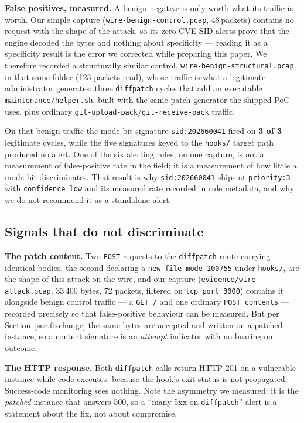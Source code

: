 \textbf{False positives, measured.} A benign negative is only worth what its
traffic is worth. Our simple capture (\texttt{wire-benign-control.pcap},
48\,packets) contains no request with the shape of the attack, so its zero
CVE-SID alerts prove that the engine decoded the bytes and nothing about
specificity --- reading it as a specificity result is the error we corrected
while preparing this paper. We therefore recorded a structurally similar control,
\texttt{wire-benign-structural.pcap} in that same folder (123 packets read),
whose traffic is what a legitimate administrator generates: three
\texttt{diffpatch} cycles that add an executable \texttt{maintenance/helper.sh},
built with the same patch generator the shipped PoC uses, plus ordinary
\texttt{git-upload-pack}\allowbreak/\allowbreak\texttt{git-receive-pack} traffic.

On that benign traffic the mode-bit signature \texttt{sid:202660041} fired on
\textbf{3 of 3} legitimate cycles, while the five signatures keyed to the
\texttt{hooks/} target path produced no alert. One of the six alerting
rules, on one capture, is not a measurement of false-positive rate in the field;
it is a measurement of how little a mode bit discriminates. That result is why
\texttt{sid:202660041} ships at \texttt{priority:3} with
\texttt{confidence~low} and its measured rate recorded in rule metadata, and why
we do not recommend it as a standalone alert.

\subsection{Signals that do not discriminate}

\textbf{The patch content.} Two \texttt{POST} requests to the
\texttt{diffpatch} route carrying identical bodies, the second declaring a
\texttt{new file mode 100755} under \texttt{hooks/}, are the shape of this
attack on the wire, and our capture (\texttt{evidence/wire-attack.pcap}, 33\,400
bytes, 72 packets, filtered on \texttt{tcp port 3000}) contains it alongside
benign control traffic --- a \texttt{GET /} and one ordinary \texttt{POST
contents} --- recorded precisely so that false-positive behaviour can be
measured. But per Section~\ref{sec:fixchange} the same bytes are accepted and
written on a patched instance, so a content signature is an \emph{attempt}
indicator with no bearing on outcome.

\textbf{The HTTP response.} Both \texttt{diffpatch} calls return HTTP 201 on a
vulnerable instance while code executes, because the hook's exit status is not
propagated. Success-code monitoring sees nothing. Note the asymmetry we
measured: it is the \emph{patched} instance that answers 500, so a ``many 5xx on
\texttt{diffpatch}'' alert is a statement about the fix, not about compromise.

